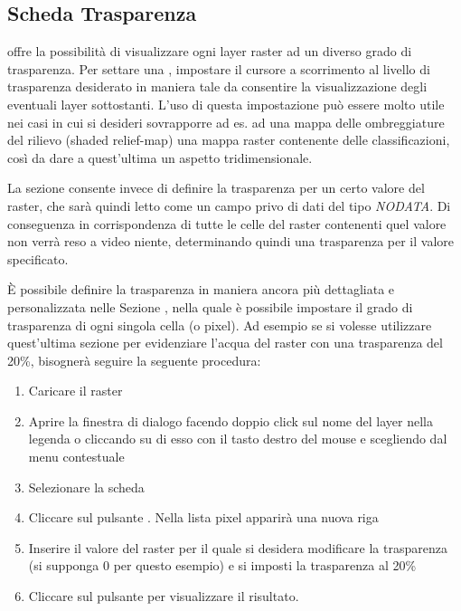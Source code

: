 \subsection{Scheda Trasparenza} \label{rastertab:transparency}

\qg offre la possibilità di visualizzare ogni layer raster ad un diverso grado di trasparenza.
Per settare una , impostare il cursore a scorrimento al livello di trasparenza desiderato
in maniera tale da consentire la visualizzazione degli eventuali layer sottostanti. 
L'uso di questa impostazione può essere molto utile nei casi in cui si
desideri sovrapporre ad es. ad una mappa delle ombreggiature del rilievo (shaded
relief-map) una mappa raster contenente delle classificazioni, così da dare  a quest'ultima un
aspetto tridimensionale.

La sezione  consente invece di definire la trasparenza per un certo valore del raster, 
che sarà quindi letto come un campo privo di dati del tipo {\em NODATA}. Di
conseguenza in corrispondenza di tutte le celle del raster contenenti quel
valore non verrà reso a video niente, determinando quindi una trasparenza per
il valore specificato.

È possibile definire la trasparenza in maniera ancora più dettagliata e
personalizzata nelle Sezione , nella quale è possibile impostare il grado di trasparenza di
ogni singola cella (o pixel).
Ad esempio se si volesse utilizzare quest'ultima sezione per evidenziare l'acqua 
del raster  con una trasparenza del 20\%, 
bisognerà seguire la seguente procedura:

\begin{enumerate}
 \item Caricare il raster 
 \item Aprire la finestra di dialogo  facendo doppio click
 sul nome del layer nella legenda o cliccando su di esso con il tasto destro del mouse e
 scegliendo  dal menu contestuale
 \item Selezionare la scheda 
 \item \label{enum:add} Cliccare sul pulsante
 . Nella lista
 pixel apparirà una nuova riga
 \item \label{enum:transp} Inserire il valore del raster per il quale si
 desidera modificare la trasparenza (si supponga 0 per questo esempio) e si
 imposti la trasparenza al 20\%
 \item Cliccare sul pulsante  per visualizzare il risultato.
\end{enumerate}

